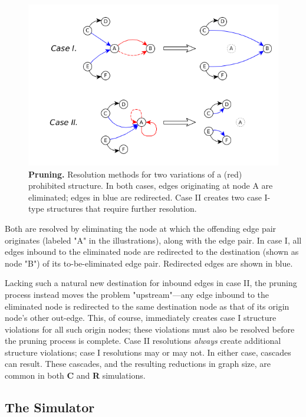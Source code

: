 \documentclass{tufte-handout}
\begin{document}
\begin{figure}
\includegraphics{pruning.png}
\caption{\textbf{Pruning.} Resolution methods for two variations of a (red) prohibited structure.
In both cases, edges originating at node A are eliminated; edges in blue are redirected.
Case II creates two case I-type structures that require further resolution.}
\label{fig:Pruning}
\end{figure}

Both are resolved by eliminating the node at which the offending edge pair
originates (labeled "A" in the illustrations), along with the edge pair.
In case I, all edges inbound to the eliminated node are redirected to 
the destination (shown as node "B") of its to-be-eliminated edge pair.
Redirected edges are shown in blue.

Lacking such a natural new destination for inbound edges in case II, the
pruning process instead moves the problem "upstream"---any edge inbound to
the eliminated node is redirected to the same destination node as that of
its origin node's other out-edge. This, of course, immediately creates
case I structure violations for all such origin nodes; these violations must also be
resolved before the pruning process is complete.
Case II resolutions \textit{always} create additional structure violations;
case I resolutions may or may not. In either case, cascades can result. These
cascades, and the resulting reductions in graph size, are common in both
\textbf{C} and \textbf{R} simulations.

\subsection{The Simulator}
\end{document}
